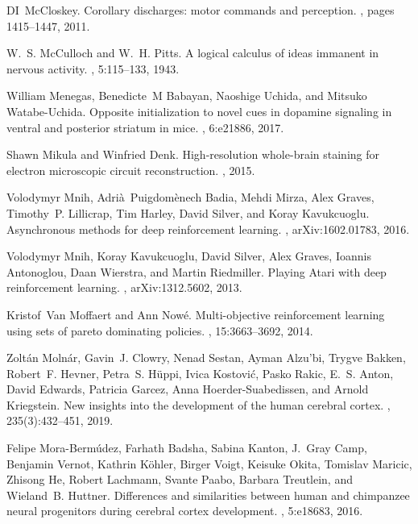 \documentclass[letterpaper,11pt]{article}
\begin{document}
\begin{thebibliography}{100}
DI~McCloskey.
\newblock Corollary discharges: motor commands and perception.
, pages 1415--1447, 2011.

W.~S. McCulloch and W.~H. Pitts.
\newblock A logical calculus of ideas immanent in nervous activity.
, 5:115--133, 1943.

William Menegas, Benedicte~M Babayan, Naoshige Uchida, and Mitsuko
  Watabe-Uchida.
\newblock Opposite initialization to novel cues in dopamine signaling in
  ventral and posterior striatum in mice.
, 6:e21886, 2017.

Shawn Mikula and Winfried Denk.
\newblock High-resolution whole-brain staining for electron microscopic circuit
  reconstruction.
, 2015.

Volodymyr Mnih, Adri{\`{a}}~Puigdom{\`{e}}nech Badia, Mehdi Mirza, Alex Graves,
  Timothy~P. Lillicrap, Tim Harley, David Silver, and Koray Kavukcuoglu.
\newblock Asynchronous methods for deep reinforcement learning.
, arXiv:1602.01783, 2016.

Volodymyr Mnih, Koray Kavukcuoglu, David Silver, Alex Graves, Ioannis
  Antonoglou, Daan Wierstra, and Martin Riedmiller.
\newblock Playing {Atari} with deep reinforcement learning.
, arXiv:1312.5602, 2013.

Kristof~Van Moffaert and Ann Now\'{e}.
\newblock Multi-objective reinforcement learning using sets of pareto
  dominating policies.
, 15:3663--3692, 2014.

Zolt\'{a}n Moln\'{a}r, Gavin~J. Clowry, Nenad Sestan, Ayman Alzu'bi, Trygve
  Bakken, Robert~F. Hevner, Petra~S. H\"{u}ppi, Ivica Kostovi\'{c}, Pasko
  Rakic, E.~S. Anton, David Edwards, Patricia Garcez, Anna Hoerder-Suabedissen,
  and Arnold Kriegstein.
\newblock New insights into the development of the human cerebral cortex.
, 235(3):432--451, 2019.

Felipe Mora-Berm{\'{u}}dez, Farhath Badsha, Sabina Kanton, J.~Gray Camp,
  Benjamin Vernot, Kathrin K{\"{o}}hler, Birger Voigt, Keisuke Okita, Tomislav
  Maricic, Zhisong He, Robert Lachmann, Svante Paabo, Barbara Treutlein, and
  Wieland~B. Huttner.
\newblock Differences and similarities between human and chimpanzee neural
  progenitors during cerebral cortex development.
, 5:e18683, 2016.


\end{thebibliography}
\end{document}
